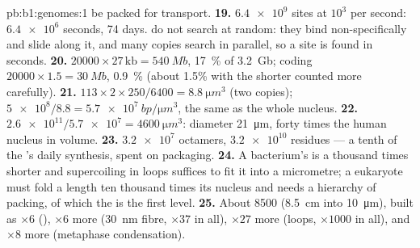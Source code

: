 \begin{solution}{pb:b1:genomes:1}
be packed for transport.
\textbf{19.} $\num{6.4e9}$ sites at $10^3$ per second: $\num{6.4e6}$
seconds, 74 days.  do not search at random: they bind 
non-specifically and slide along it, and many copies search in
parallel, so a site is found in seconds.
\textbf{20.} $\num{20000}\times 27\,\mathrm{kb} = \qty{540}{Mb}$,
\qty{17}{\%} of \qty{3.2}{Gb}; coding $\num{20000}\times 1.5 =
\qty{30}{Mb}$, \qty{0.9}{\%} (about 1.5\% with the shorter  counted
more carefully).
\textbf{21.} $113\times 2\times 250/6400 = \qty{8.8}{\micro m^3}$ (two
copies); $\num{5e8}/8.8 = \qty{5.7e7}{bp/\micro m^3}$, the same as the
whole nucleus.
\textbf{22.} $\num{2.6e11}/\num{5.7e7} = \qty{4600}{\micro m^3}$:
diameter \qty{21}{\micro m}, forty times the human nucleus in volume.
\textbf{23.} $\num{3.2e7}$ octamers, $\num{3.2e10}$ residues --- a tenth
of the 's daily  synthesis, spent on packaging.
\textbf{24.} A bacterium's  is a thousand times shorter and
supercoiling in loops suffices to fit it into a micrometre; a
eukaryote must fold a length ten thousand times its nucleus and needs
a hierarchy of packing, of which the  is the first level.
\textbf{25.} About \num{8500} (\qty{8.5}{cm} into \qty{10}{\micro m}),
built as $\times 6$ (), $\times 6$ more (\qty{30}{nm} fibre,
$\times 37$ in all), $\times 27$ more (loops, $\times 1000$ in all), and
$\times 8$ more (metaphase condensation).
\end{solution}
